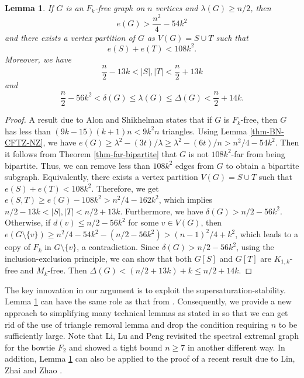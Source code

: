\documentclass[11pt]{article}
\newtheorem{lemma}[theorem]{Lemma}
\begin{document}
\begin{lemma} \label{lem-Fk}
If $G$ is an $F_k$-free graph on $n$ vertices
 and $\lambda (G)\ge {n}/{2}$, 
then 
\[  e(G)> \frac{n^2}{4} - 54k^2 \] 
 and there exists a vertex partition of $G$ as  
$V(G)=S\cup T$ such that 
\[  e(S) + e(T)< 108k^2. \]  
Moreover, we have 
\[  \frac{n}{2} -13k < |S|, |T| < \frac{n}{2} +13k \] 
 and 
\[  \frac{n}{2} - 56 k^2 < \delta (G) 
\le \lambda (G) \le \Delta (G) < \frac{n}{2} + 14k. \] 
\end{lemma}

\begin{proof}
A result due to Alon and Shikhelman \cite[Lemma 3.1]{AS2016} states that 
if $G$ is $F_k$-free, then $G$ has less than 
$(9k-15)(k+1)n < 9k^2n$ triangles. 
Using Lemma \ref{thm-BN-CFTZ-NZ}, 
we have $e(G) \ge \lambda^2- {(3t)}/{\lambda} \ge  
\lambda^2 - {(6t)}/{n} > n^2/4 - 54k^2$.  
Then it follows from Theorem \ref{thm-far-bipartite}  
that $G$ is not $108k^2$-far from being bipartite.  
Thus, we can remove less than $108k^2$ edges from $G$ to obtain 
a bipartite subgraph. Equivalently, there exists a vertex partition $V(G)=S\cup T$ such that 
$e(S) + e(T)< 108k^2$. Therefore, we get $e(S,T)\ge e(G)- 108k^2 
> n^2/4 - 162k^2$, which implies 
$n/2 - 13k < |S|,|T| < n/2 + 13k$. 
Furthermore, we have  $\delta (G)>  n/2 - 56k^2$.  
Otherwise, if $d(v)\le n/2 - 56k^2$ for some $v\in V(G)$, 
then $e(G\setminus \{v\})\ge n^2/4 - 54k^2 - (n/2 - 56k^2) 
> (n-1)^2/4 + k^2$, which leads to a copy of $F_k$ in $G\setminus \{v\}$, 
a contradiction. 
Since $\delta(G) > n/2 - 56k^2$, using the inclusion-exclusion principle, 
we can show that both $G[S]$ and $G[T]$ 
are $K_{1,k}$-free and $M_k$-free. Then 
 $\Delta (G)< (n/2 + 13k) + k \le n/2 + 14k$. 
\end{proof}


The key innovation in our argument 
is to exploit the supersaturation-stability. 
 Lemma \ref{lem-Fk} can have the same role as that from \cite[Lemma 15]{CFTZ20}. 
Consequently, we provide a new approach to simplifying  
 many  technical lemmas as stated in \cite{CFTZ20} 
 so that we can get rid of the use of triangle removal lemma and drop the condition requiring  $n$ to be sufficiently large.  
Note that Li, Lu and Peng  \cite{2022LLP} 
revisited the spectral extremal graph for the bowtie $F_2$ 
and showed a tight bound $n\ge 7$ in another different way. 
In addition, Lemma \ref{lem-Fk} can also be applied 
to the proof of a recent result due to Lin, Zhai and Zhao \cite[Theorem 7]{LZZ2022}.  
\end{document}
